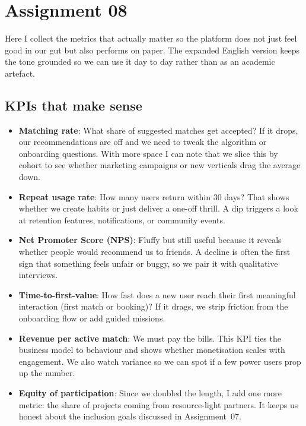 \section*{Assignment 08}

Here I collect the metrics that actually matter so the platform does not just feel good in our gut but also performs on paper. The expanded English version keeps the tone grounded so we can use it day to day rather than as an academic artefact.

\subsection*{KPIs that make sense}
\begin{itemize}
    \item \textbf{Matching rate}: What share of suggested matches get accepted? If it drops, our recommendations are off and we need to tweak the algorithm or onboarding questions. With more space I can note that we slice this by cohort to see whether marketing campaigns or new verticals drag the average down.
    \item \textbf{Repeat usage rate}: How many users return within 30 days? That shows whether we create habits or just deliver a one-off thrill. A dip triggers a look at retention features, notifications, or community events.
    \item \textbf{Net Promoter Score (NPS)}: Fluffy but still useful because it reveals whether people would recommend us to friends. A decline is often the first sign that something feels unfair or buggy, so we pair it with qualitative interviews.
    \item \textbf{Time-to-first-value}: How fast does a new user reach their first meaningful interaction (first match or booking)? If it drags, we strip friction from the onboarding flow or add guided missions.
    \item \textbf{Revenue per active match}: We must pay the bills. This KPI ties the business model to behaviour and shows whether monetisation scales with engagement. We also watch variance so we can spot if a few power users prop up the number.
    \item \textbf{Equity of participation}: Since we doubled the length, I add one more metric: the share of projects coming from resource-light partners. It keeps us honest about the inclusion goals discussed in Assignment~07.
\end{itemize}

